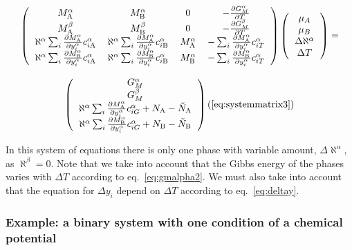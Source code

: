 \documentclass[12pt]{article}
\begin{document}
\[
\left(
\begin{tabular}{cccc}
$M^{\alpha}_{\rm A}$ & $M^{\alpha}_{\rm B}$ & 0  &
$-\frac{\partial G^{\alpha}_M}{\partial T}$ \\
$M^{\beta}_{\rm A}$ & $M^{\beta}_{\rm B}$ & 0 &
$-\frac{\partial G^{\beta}_M}{\partial T}$ \\
$\aleph^{\alpha}\sum_i\frac{\partial M^{\alpha}_{\rm A}}{\partial y_i^{\alpha}}
c^{\alpha}_{i{\rm A}}$ &
$\aleph^{\alpha}\sum_i\frac{\partial M^{\alpha}_{\rm A}}{\partial y_i^{\alpha}}
c^{\alpha}_{i{\rm B}}$ &
$M^{\alpha}_{\rm A}$ &
$-\sum_i \frac{\partial M_{\rm A}^{\alpha}}{\partial y_i^{\alpha}}
c_{iT}^{\alpha}$ \\
$\aleph^{\alpha}\sum_i\frac{\partial M^{\alpha}_{\rm B}}{\partial y_i^{\alpha}}
c^{\alpha}_{i{\rm A}}$ &
$\aleph^{\alpha}\sum_i\frac{\partial M^{\alpha}_{\rm B}}{\partial y_i^{\alpha}}
c^{\alpha}_{i{\rm B}}$ &
$M^{\alpha}_{\rm B}$ &
$-\sum_i \frac{\partial M_{\rm B}^{\alpha}}{\partial y_i^{\alpha}}
c_{iT}^{\alpha}$ \\
\end{tabular}
\right)
\left(
\begin{tabular}{c}
$\mu_A$\\
$\mu_B$\\
$\Delta \aleph^{\alpha}$\\
$\Delta T$
\end{tabular}
\right)
=\]

\[
\left(
\begin{tabular}{c}
$G_M^{\alpha}$\\
$G_M^{\beta}$\\
$\aleph^{\alpha} \sum_i \frac{\partial M^{\alpha}_{\rm A}}{\partial y_i^{\alpha}} c^{\alpha}_{iG}+N_{\rm A}-\tilde N_{\rm A}$\\
$\aleph^{\alpha} \sum_i \frac{\partial M^{\alpha}_{\rm B}}{\partial y_i^{\alpha}} c^{\alpha}_{iG}+N_{\rm B}-\tilde N_{\rm B}$\\
\end{tabular}
\right)
\\ (\ref{eq:systemmatrix3})
\]

In this system of equations there is only one phase with variable
amount, $\Delta\aleph^{\alpha}$, as $\aleph^{\beta}=0$.  Note that we
take into account that the Gibbs energy of the phases varies with
$\Delta T$ according to eq.~\ref{eq:gmalpha2}.  We must also take into
account that the equation for $\Delta y_i$ depend on $\Delta T$
according to eq.~\ref{eq:deltay}.

\subsubsection{Example: a binary system with one condition of
a chemical potential}
\end{document}
